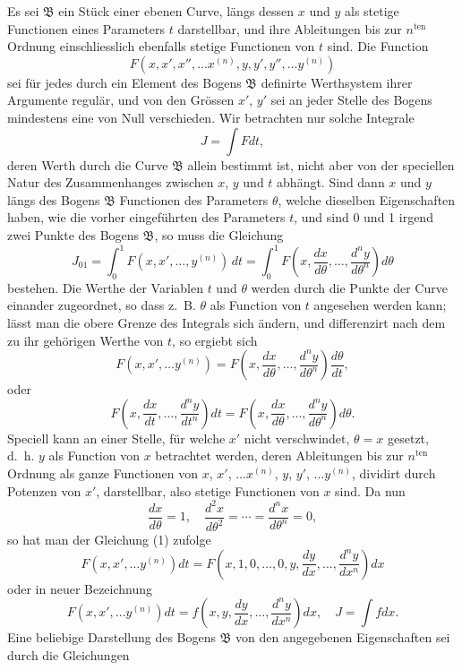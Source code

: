 \documentclass[11pt,a4paper,leqno]{article}
\begin{document}
Es sei $\mathfrak B$ ein Stück einer ebenen Curve, längs dessen $x$ und $y$ als stetige Functionen eines Parameters $t$ darstellbar, und ihre Ableitungen bis zur $n^{\mathrm{ten}}$ Ordnung einschliesslich ebenfalls stetige Functionen von $t$ sind. Die Function
\[
F(x,x',x'',\ldots x^{(n)},y,y',y'',\ldots y^{(n)})
\]
sei für jedes durch ein Element des Bogens $\mathfrak B$ definirte Werthsystem ihrer Argumente regulär, und von den Grössen $x'$, $y'$ sei an jeder Stelle des Bogens mindestens eine von Null verschieden. Wir betrachten nur solche Integrale
\[
J=\int Fdt,
\]
deren Werth durch die Curve $\mathfrak B$ allein bestimmt ist, nicht aber von der speciellen Natur des Zusammenhanges zwischen $x$, $y$ und $t$ abhängt. Sind dann $x$ und $y$ längs des Bogens $\mathfrak B$ Functionen des Parameters $\theta$, welche dieselben Eigenschaften haben, wie die vorher eingeführten des Parameters $t$, und sind 0 und 1 irgend zwei Punkte des Bogens $\mathfrak B$, so muss die Gleichung
\[
J_{01}=\int_0^1 F(x,x',\ldots,y^{(n)})\,dt
=\int_0^1 F\left(x,\frac{dx}{d\theta},\ldots,\frac{d^ny}{d\theta^n}\right)d\theta
\]
bestehen. Die Werthe der Variablen $t$ und $\theta$ werden durch die Punkte der Curve einander zugeordnet, so dass z.~B. $\theta$ als Function von $t$ angesehen werden kann; lässt man die obere Grenze des Integrals sich ändern, und differenzirt nach dem zu ihr
gehörigen Werthe von $t$, so ergiebt sich
\[
F(x,x',\ldots y^{(n)})
=F\left(x,\frac{dx}{d\theta},\ldots,\frac{d^ny}{d\theta^n}\right)\frac{d\theta}{dt},
\]
oder
\begin{equation}\tag{1}
F\left(x,\frac{dx}{dt},\ldots,\frac{d^ny}{dt^n}\right)dt
=F\left(x,\frac{dx}{d\theta},\ldots,\frac{d^ny}{d\theta^n}\right)d\theta.
\end{equation}
Speciell kann an einer Stelle, für welche $x'$ nicht verschwindet, $\theta=x$ gesetzt, d.~h. $y$ als Function von $x$ betrachtet werden, deren Ableitungen bis zur $n^{\mathrm{ten}}$ Ordnung als ganze Functionen von $x$, $x'$, $\ldots x^{(n)}$, $y$, $y'$, $\ldots y^{(n)}$, dividirt durch Potenzen von $x'$, darstellbar, also stetige Functionen von $x$ sind. Da nun
\[
\frac{dx}{d\theta}=1,
\quad
\frac{d^2x}{d\theta^2}=\cdots=\frac{d^nx}{d\theta^n}=0,
\]
so hat man der Gleichung (1) zufolge
\[
F(x,x',\ldots y^{(n)})dt
=F\left(x,1,0,\ldots,0,y,\frac{dy}{dx},\ldots,\frac{d^ny}{dx^n}\right)dx
\]
oder in neuer Bezeichnung
\[
F(x,x',\ldots y^{(n)})dt
=f\left(x,y,\frac{dy}{dx},\ldots,\frac{d^ny}{dx^n}\right)dx,
\quad J=\int fdx.
\]
Eine beliebige Darstellung des Bogens $\mathfrak B$ von den angegebenen Eigenschaften sei durch die Gleichungen
\end{document}
